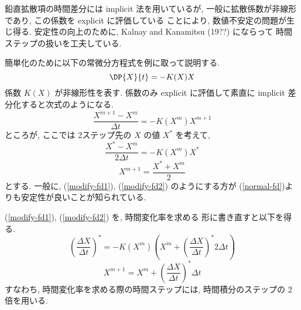 鉛直拡散項の時間差分には implicit 法を用いているが, 
一般に拡散係数が非線形であり, この係数を explicit に評価している
ことにより, 数値不安定の問題が生じ得る. 
安定性の向上のために, Kalnay and Kanamitsu (19??) にならって
時間ステップの扱いを工夫している. 

簡単化のために以下の常微分方程式を例に取って説明する. 
\begin{equation}
  \DP{X}{t} = - K(X) X
\end{equation}
係数 $K(X)$ が非線形性を表す. 
係数のみ explicit に評価して素直に implicit 差分化すると次式のようになる. 
\begin{equation}
  \frac{X^{m+1} - X^m}{\Delta t} = - K( X^m ) X^{m+1}
  \label{normal-fd}
\end{equation}
ところが, ここでは 2ステップ先の $X$ の値 $X^{\ast}$ を考えて, 
\begin{equation}
  \frac{X^{\ast} - X^m}{2\Delta t} = - K ( X^m ) X^{\ast}
  \label{modify-fd1}
\end{equation}
\begin{equation}
  X^{m+1} = \frac{X^{\ast} + X^m}2
  \label{modify-fd2}
\end{equation}
とする. 
一般に, (\ref{modify-fd1}), (\ref{modify-fd2}) のようにする方が
(\ref{normal-fd})よりも安定性が良いことが知られている. 

(\ref{modify-fd1}), (\ref{modify-fd2}) を, 時間変化率を求める
形に書き直すと以下を得る. 
\begin{equation}
  \left(\frac{\Delta X}{\Delta t}\right)^{\ast} = 
     - K( X^m ) \left( X^m + 
        \left(\frac{\Delta X}{\Delta t}\right)^{\ast} 
        2 \Delta t \right)
\end{equation}
\begin{equation}
  X^{m+1} = X^m + \left(\frac{\Delta X}{\Delta t}\right)^{\ast} \Delta t
\end{equation}
すなわち, 時間変化率を求める際の時間ステップには, 
時間積分のステップの 2 倍を用いる. 

